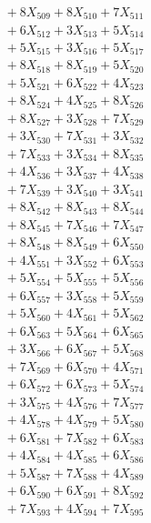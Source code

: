 \documentclass[a4paper,10pt]{article}
\begin{document}
{\begin{align}
&\;  + 8 X_{509} + 8 X_{510} + 7 X_{511} \\[0.3ex]
&\;  + 6 X_{512} + 3 X_{513} + 5 X_{514} \\[0.3ex]
&\;  + 5 X_{515} + 3 X_{516} + 5 X_{517} \\[0.3ex]
&\;  + 8 X_{518} + 8 X_{519} + 5 X_{520} \\[0.5ex]\allowbreak
&\;  + 5 X_{521} + 6 X_{522} + 4 X_{523} \\[0.3ex]
&\;  + 8 X_{524} + 4 X_{525} + 8 X_{526} \\[0.3ex]
&\;  + 8 X_{527} + 3 X_{528} + 7 X_{529} \\[0.3ex]
&\;  + 3 X_{530} + 7 X_{531} + 3 X_{532} \\[0.3ex]
&\;  + 7 X_{533} + 3 X_{534} + 8 X_{535} \\[0.3ex]
&\;  + 4 X_{536} + 3 X_{537} + 4 X_{538} \\[0.3ex]
&\;  + 7 X_{539} + 3 X_{540} + 3 X_{541} \\[0.3ex]
&\;  + 8 X_{542} + 8 X_{543} + 8 X_{544} \\[0.3ex]
&\;  + 8 X_{545} + 7 X_{546} + 7 X_{547} \\[0.3ex]
&\;  + 8 X_{548} + 8 X_{549} + 6 X_{550} \\[0.5ex]\allowbreak
&\;  + 4 X_{551} + 3 X_{552} + 6 X_{553} \\[0.3ex]
&\;  + 5 X_{554} + 5 X_{555} + 5 X_{556} \\[0.3ex]
&\;  + 6 X_{557} + 3 X_{558} + 5 X_{559} \\[0.3ex]
&\;  + 5 X_{560} + 4 X_{561} + 5 X_{562} \\[0.3ex]
&\;  + 6 X_{563} + 5 X_{564} + 6 X_{565} \\[0.3ex]
&\;  + 3 X_{566} + 6 X_{567} + 5 X_{568} \\[0.3ex]
&\;  + 7 X_{569} + 6 X_{570} + 4 X_{571} \\[0.3ex]
&\;  + 6 X_{572} + 6 X_{573} + 5 X_{574} \\[0.3ex]
&\;  + 3 X_{575} + 4 X_{576} + 7 X_{577} \\[0.3ex]
&\;  + 4 X_{578} + 4 X_{579} + 5 X_{580} \\[0.5ex]\allowbreak
&\;  + 6 X_{581} + 7 X_{582} + 6 X_{583} \\[0.3ex]
&\;  + 4 X_{584} + 4 X_{585} + 6 X_{586} \\[0.3ex]
&\;  + 5 X_{587} + 7 X_{588} + 4 X_{589} \\[0.3ex]
&\;  + 6 X_{590} + 6 X_{591} + 8 X_{592} \\[0.3ex]
&\;  + 7 X_{593} + 4 X_{594} + 7 X_{595} \\[0.3ex]

\end{align}}
\end{document}
